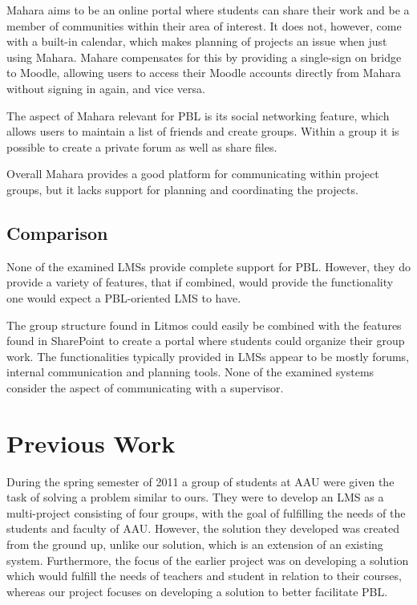 Mahara aims to be an online portal where students can share their work and be a member of communities within their area of interest.
It does not, however, come with a built-in calendar, which makes planning of projects an issue when just using Mahara.
Mahare compensates for this by providing a single-sign on bridge to Moodle, allowing users to access their Moodle accounts directly from Mahara without signing in again, and vice versa.

The aspect of Mahara relevant for PBL is its social networking feature, which allows users to maintain a list of friends and create groups.
Within a group it is possible to create a private forum as well as share files.

Overall Mahara provides a good platform for communicating within project groups, but it lacks support for planning and coordinating the projects.

\subsection{Comparison}
None of the examined LMSs provide complete support for PBL.
However, they do provide a variety of features, that if combined, would provide the functionality one would expect a PBL-oriented LMS to have.

The group structure found in Litmos could easily be combined with the features found in SharePoint to create a portal where students could organize their group work.
The functionalities typically provided in LMSs appear to be mostly forums, internal communication and planning tools.
None of the examined systems consider the aspect of communicating with a supervisor.

\section{Previous Work}
\label{sec:prevwork}
During the spring semester of 2011 a group of students at AAU were given the task of solving a problem similar to ours. 
They were to develop an LMS as a multi-project consisting of four groups, with the goal of fulfilling the needs of the students and faculty of AAU.
However, the solution they developed was created from the ground up, unlike our solution, which is an extension of an existing system.
Furthermore, the focus of the earlier project was on developing a solution which would fulfill the needs of teachers and student in relation to their courses, whereas our project focuses on developing a solution to better facilitate PBL. 

